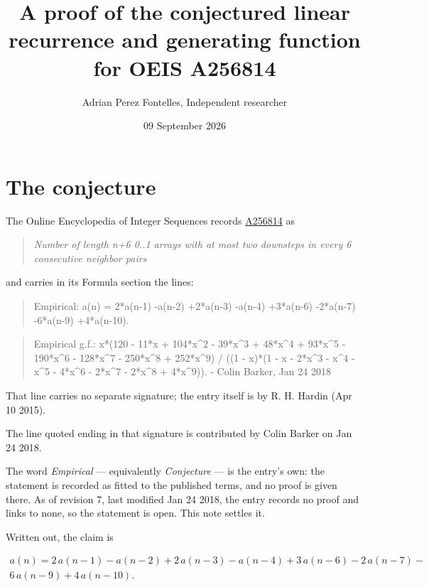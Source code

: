 \documentclass[11pt]{article}
\title{A proof of the conjectured linear recurrence and generating function for OEIS A256814}
\author{Adrian Perez Fontelles, Independent researcher}
\date{09 September 2026}
\theoremstyle{definition}
\begin{document}
\maketitle
\section{The conjecture}

The Online Encyclopedia of Integer Sequences records \href{https://oeis.org/A256814}{A256814} as

\begin{quote}\itshape Number of length n+6 0..1 arrays with at most two downsteps in every 6 consecutive neighbor pairs\end{quote}

and carries in its Formula section the lines:

\begin{quote}\ttfamily Empirical: a(n) = 2*a(n-1) -a(n-2) +2*a(n-3) -a(n-4) +3*a(n-6) -2*a(n-7) -6*a(n-9) +4*a(n-10).\end{quote}

\begin{quote}\ttfamily Empirical g.f.: x*(120 - 11*x + 104*x\textasciicircum{}2 - 39*x\textasciicircum{}3 + 48*x\textasciicircum{}4 + 93*x\textasciicircum{}5 - 190*x\textasciicircum{}6 - 128*x\textasciicircum{}7 - 250*x\textasciicircum{}8 + 252*x\textasciicircum{}9) / ((1 - x)*(1 - x - 2*x\textasciicircum{}3 - x\textasciicircum{}4 - x\textasciicircum{}5 - 4*x\textasciicircum{}6 - 2*x\textasciicircum{}7 - 2*x\textasciicircum{}8 + 4*x\textasciicircum{}9)). - Colin Barker, Jan 24 2018\end{quote}

That line carries no separate signature; the entry itself is by R. H. Hardin (Apr 10 2015).

The line quoted ending in that signature is contributed by Colin Barker on Jan 24 2018.

The word {\itshape Empirical} --- equivalently {\itshape Conjecture} --- is the entry's own: the statement is recorded as fitted to the published terms, and no proof is given there. As of revision 7, last modified Jan 24 2018, the entry records no proof and links to none, so the statement is open. This note settles it.

Written out, the claim is

\begin{multline*} a(n) = 2\,a(n-1) - a(n-2) + 2\,a(n-3) - a(n-4) + 3\,a(n-6) - 2\,a(n-7) - \\ 6\,a(n-9) + 4\,a(n-10). \end{multline*}
\end{document}
